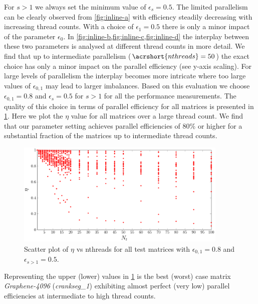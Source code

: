 %
For $s > 1$ we always set the minimum value of $\epsilon_s=0.5$. The limited parallelism can be clearly observed from \cref{fig:inline-a}  with efficiency steadily decreasing with increasing thread counts. With a choice of $\epsilon_1=0.5$ there is only a minor impact of the parameter $\epsilon_0$. In \cref{fig:inline-b,fig:inline-c,fig:inline-d} the interplay between these two parameters is analysed at different thread counts in more detail. We find that up to intermediate parallelism ($\acrshort{nthreads}=50$) the exact choice has only a minor impact on the parallel efficiency (see y-axis scaling). For large levels of parallelism the interplay becomes more intricate where too large values of $\epsilon_{0,1}$ may lead to larger imbalances. Based on this evaluation we choose $\epsilon_{0,1}=0.8$ and $\epsilon_s=0.5$ for $s>1$ for all the performance measurements. The quality of this choice in terms of parallel efficiency for all matrices is presented in \cref{fig:param_all_mtx_stat}. Here we plot the $\eta$ value for all matrices over a large thread count. We find that our parameter setting achieves parallel efficiencies of 80\% or higher for a substantial fraction of the matrices up to intermediate thread counts. 
   \begin{figure}[tbhp]
   	\centering
   	\includegraphics[height=0.19\textheight,width=0.9\textwidth]{pics/param_study/scatter_plot}
   	\caption{Scatter plot of $\eta$ vs \acrshort{nthreads} for all test matrices with $\epsilon_{0,1} = 0.8$ and $\epsilon_{s>1} = 0.5$.}
  	\label{fig:param_all_mtx_stat}
   \end{figure}
Representing the upper (lower) values in \cref{fig:param_all_mtx_stat} is the best (worst) case matrix \emph{Graphene-4096} (\emph{crankseg\_1}) exhibiting almost perfect (very low) parallel efficiencies at intermediate to high thread counts.

